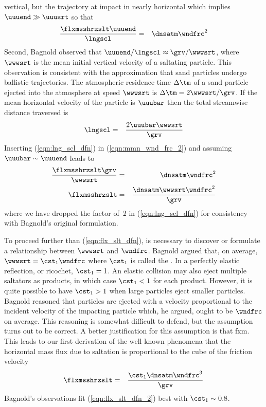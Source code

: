 \documentclass[12pt,twoside]{book}
\begin{document}
vertical, but the trajectory at impact in nearly horizontal which
implies $\uuuend \gg \uuusrt$ so that   
\begin{eqnarray}
\frac{\flxmsshrzslt \uuuend}{\lngscl } & = & \dnsatm \wndfrc^{2}
\label{eqn:mmn_wnd_frc_2}
\end{eqnarray}
Second, Bagnold observed that $\uuuend / \lngscl \approx \grv /
\wwwsrt$, where $\wwwsrt$ is the mean initial vertical velocity of a
saltating particle.
This observation is consistent with the approximation that sand
particles undergo ballistic trajectories. 
The atmospheric residence time $\Delta \tm$ of a sand particle ejected
into the atmosphere at speed $\wwwsrt$ is 
$\Delta \tm = 2 \wwwsrt / \grv$.
If the mean horizontal velocity of the particle is $\uuubar$ then
the total streamwise distance traversed is 
\begin{eqnarray}
\lngscl & = & \frac{2 \uuubar \wwwsrt}{\grv }
\label{eqn:lng_scl_dfn}
\end{eqnarray}
Inserting (\ref{eqn:lng_scl_dfn}) in (\ref{eqn:mmn_wnd_frc_2}) and
assuming $\uuubar \sim \uuuend$ leads to 
\begin{eqnarray}
\frac{\flxmsshrzslt \grv}{\wwwsrt } & = & \dnsatm \wndfrc^{2} \nonumber \\
\flxmsshrzslt & = & \frac{\dnsatm \wwwsrt \wndfrc^{2}}{\grv }
\label{eqn:flx_slt_dfn}
\end{eqnarray}
where we have dropped the factor of~2 in (\ref{eqn:lng_scl_dfn}) for
consistency with Bagnold's original formulation.

To proceed further than (\ref{eqn:flx_slt_dfn}), is necessary to
discover or formulate a relationship between $\wwwsrt$ and $\wndfrc$.
Bagnold argued that, on average, $\wwwsrt = \cst_{1} \wndfrc$
where $\cst_{1}$ is called the .
In a perfectly elastic reflection, or ricochet, $\cst_{1} = 1$.
An elastic collision may also eject multiple saltators as products, in
which case $\cst_{1} < 1$ for each product. 
However, it is quite possible to have $\cst_{1} > 1$ when large
particles eject smaller particles. 
Bagnold reasoned that particles are ejected with a velocity
proportional to the incident velocity of the impacting particle which,
he argued, ought to be $\wndfrc$ on average.  
This reasoning is somewhat difficult to defend, but the assumption
turns out to be correct.
A better justification for this assumption is that fxm.
This leads to our first derivation of the well known phenomena that
the horizontal mass flux due to saltation is proportional to the cube
of the friction velocity
\begin{eqnarray}
\flxmsshrzslt & = & \frac{\cst_{1} \dnsatm \wndfrc^{3}}{\grv }
\label{eqn:flx_slt_dfn_2}
\end{eqnarray}
Bagnold's observations fit (\ref{eqn:flx_slt_dfn_2}) best with $\cst_{1}
\sim 0.8$.
\end{document}

